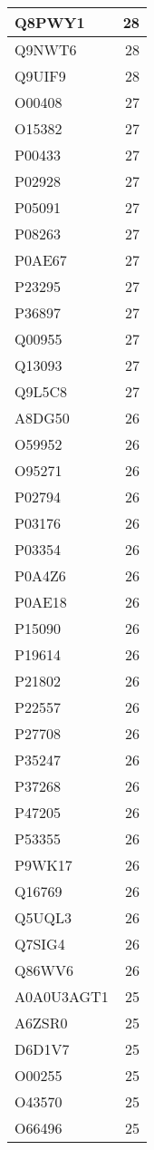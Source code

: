 \documentclass[
]{book}
\theoremstyle{definition}
\theoremstyle{definition}
\theoremstyle{definition}
\theoremstyle{definition}
\theoremstyle{remark}
\begin{document}
\begin{table}
\begin{tabular}{l|r}
\hline
Q8PWY1 & 28\\
\hline
Q9NWT6 & 28\\
\hline
Q9UIF9 & 28\\
\hline
O00408 & 27\\
\hline
O15382 & 27\\
\hline
P00433 & 27\\
\hline
P02928 & 27\\
\hline
P05091 & 27\\
\hline
P08263 & 27\\
\hline
P0AE67 & 27\\
\hline
P23295 & 27\\
\hline
P36897 & 27\\
\hline
Q00955 & 27\\
\hline
Q13093 & 27\\
\hline
Q9L5C8 & 27\\
\hline
A8DG50 & 26\\
\hline
O59952 & 26\\
\hline
O95271 & 26\\
\hline
P02794 & 26\\
\hline
P03176 & 26\\
\hline
P03354 & 26\\
\hline
P0A4Z6 & 26\\
\hline
P0AE18 & 26\\
\hline
P15090 & 26\\
\hline
P19614 & 26\\
\hline
P21802 & 26\\
\hline
P22557 & 26\\
\hline
P27708 & 26\\
\hline
P35247 & 26\\
\hline
P37268 & 26\\
\hline
P47205 & 26\\
\hline
P53355 & 26\\
\hline
P9WK17 & 26\\
\hline
Q16769 & 26\\
\hline
Q5UQL3 & 26\\
\hline
Q7SIG4 & 26\\
\hline
Q86WV6 & 26\\
\hline
A0A0U3AGT1 & 25\\
\hline
A6ZSR0 & 25\\
\hline
D6D1V7 & 25\\
\hline
O00255 & 25\\
\hline
O43570 & 25\\
\hline
O66496 & 25\\

\end{tabular}
\end{table}
\end{document}
